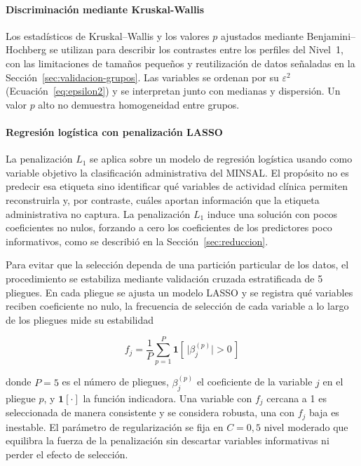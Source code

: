 \paragraph{Discriminación mediante Kruskal-Wallis}
\label{sec:kruskal-seleccion}

Los estadísticos de Kruskal--Wallis y los valores $p$ ajustados mediante
Benjamini--Hochberg se utilizan para describir los contrastes entre los perfiles
del Nivel~1, con las limitaciones de tamaños pequeños y reutilización de datos
señaladas en la Sección~\ref{sec:validacion-grupos}. Las variables se ordenan
por su $\varepsilon^2$ (Ecuación~\ref{eq:epsilon2}) y se interpretan junto con
medianas y dispersión. Un valor $p$ alto no demuestra homogeneidad entre grupos.

\paragraph{Regresión logística con penalización LASSO}
\label{sec:lasso}

La penalización $L_1$ se aplica sobre un modelo de regresión logística usando
como variable objetivo la clasificación administrativa del MINSAL. El propósito no es predecir esa etiqueta sino
identificar qué variables de actividad clínica permiten reconstruirla y, por
contraste, cuáles aportan información que la etiqueta administrativa no captura.
La penalización $L_1$ induce una solución con pocos coeficientes no nulos, forzando a cero los coeficientes
de los predictores poco informativos, como se describió en la
Sección~\ref{sec:reduccion}.

Para evitar que la selección dependa de una partición particular de los datos,
el procedimiento se estabiliza mediante validación cruzada estratificada de 5
pliegues. En cada pliegue se ajusta un modelo LASSO y se registra qué variables
reciben coeficiente no nulo, la frecuencia de selección de cada variable
a lo largo de los pliegues mide su estabilidad

\begin{equation}
f_j = \frac{1}{P} \sum_{p=1}^{P}
      \mathbf{1}\!\left[\,\lvert \beta_j^{(p)} \rvert > 0 \,\right]
\label{eq:frecuencia-lasso}
\end{equation}

donde $P = 5$ es el número de pliegues, $\beta_j^{(p)}$ el coeficiente de la
variable $j$ en el pliegue $p$, y $\mathbf{1}[\cdot]$ la función indicadora. Una
variable con $f_j$ cercana a 1 es seleccionada de manera consistente y se
considera robusta, una con $f_j$ baja es inestable. El parámetro de
regularización se fija en $C = 0{,}5$ nivel moderado que equilibra la fuerza
de la penalización sin descartar variables informativas ni perder el efecto de
selección.

